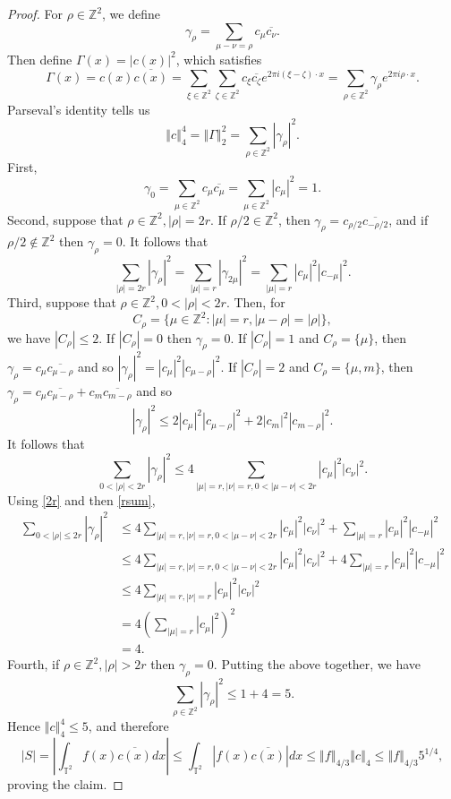 \documentclass{article}
\newcommand{\norm}[1]{\left\Vert #1 \right\Vert}
\theoremstyle{definition}
\begin{document}
\begin{proof}
For $\rho \in \mathbb{Z}^2$, we define
\[
\gamma_\rho = \sum_{\mu-\nu=\rho} c_\mu \overline{c_\nu}.
\]
Then  define 
$\Gamma(x) = |c(x)|^2$,
which satisfies
\[
\Gamma(x) = c(x) \overline{c(x)}=
\sum_{\xi \in \mathbb{Z}^2} \sum_{\zeta \in \mathbb{Z}^2} c_\xi \overline{c_\zeta} e^{2\pi i(\xi-\zeta)\cdot x}
=\sum_{\rho \in \mathbb{Z}^2} \gamma_\rho e^{2\pi i\rho \cdot x}.
\]
Parseval's identity tells us
\[
\norm{c}_4^4 = \norm{\Gamma}_2^2 = \sum_{\rho \in \mathbb{Z}^2} |\gamma_\rho|^2.
\]
First,
\[
\gamma_0 = \sum_{\mu \in \mathbb{Z}^2} c_\mu \overline{c_\mu}
=\sum_{\mu \in \mathbb{Z}^2} |c_\mu|^2
=1.
\]
Second, suppose that $\rho \in \mathbb{Z}^2, |\rho|=2r$. If $\rho/2 \in \mathbb{Z}^2$, then $\gamma_\rho = c_{\rho/2} \overline{c_{-\rho/2}}$, 
and if $\rho/2 \not \in \mathbb{Z}^2$ then $\gamma_\rho=0$. It follows that
\begin{equation}
\sum_{|\rho|=2r} |\gamma_\rho|^2 = \sum_{|\mu|=r} |\gamma_{2\mu}|^2 = 
\sum_{|\mu|=r} |c_\mu|^2 |c_{-\mu}|^2.
\label{2r}
\end{equation}
Third, suppose that $\rho \in \mathbb{Z}^2, 0<|\rho|<2r$. Then, for
\[
C_\rho=\{\mu \in \mathbb{Z}^2: |\mu|=r, |\mu-\rho|=|\rho|\},
\] 
we have $|C_\rho| \leq 2$. If $|C_\rho|=0$ then $\gamma_\rho=0$. If $|C_\rho|=1$ and $C_\rho=\{\mu\}$, then
$\gamma_\rho = c_\mu \overline{c_{\mu-\rho}}$ and so
$|\gamma_\rho|^2 = |c_\mu|^2 |c_{\mu-\rho}|^2$.
If $|C_\rho|=2$ and $C_\rho=\{\mu,m\}$, then
$\gamma_\rho=c_\mu \overline{c_{\mu-\rho}}+c_m \overline{c_{m-\rho}}$ and so
\[
|\gamma_\rho|^2 \leq 2 |c_\mu|^2 |c_{\mu-\rho}|^2+2|c_m|^2 |c_{m-\rho}|^2.
\]
It follows that
\[
\sum_{0<|\rho|<2r} |\gamma_\rho|^2 \leq 4\sum_{|\mu|=r, |\nu|=r, 0<|\mu-\nu|<2r} |c_\mu|^2 |c_\nu|^2.
\]
Using \eqref{2r} and then \eqref{rsum},
\begin{align*}
\sum_{0<|\rho| \leq 2r} |\gamma_\rho|^2&  \leq 4\sum_{|\mu|=r, |\nu|=r, 0<|\mu-\nu|<2r} |c_\mu|^2 |c_\nu|^2+
\sum_{|\mu|=r} |c_\mu|^2 |c_{-\mu}|^2\\
&\leq 4\sum_{|\mu|=r, |\nu|=r, 0<|\mu-\nu|<2r} |c_\mu|^2 |c_\nu|^2+4\sum_{|\mu|=r} |c_\mu|^2 |c_{-\mu}|^2\\
&\leq 4\sum_{|\mu|=r, |\nu|=r}|c_\mu|^2 |c_\nu|^2\\
&=4\left( \sum_{|\mu|=r} |c_\mu|^2 \right)^2\\
&=4.
\end{align*}
Fourth, if $\rho \in \mathbb{Z}^2, |\rho|>2r$ then $\gamma_\rho=0$. Putting the above together,
we have
\[
\sum_{\rho \in \mathbb{Z}^2} |\gamma_\rho|^2 \leq 1+4=5.
\]
Hence $\norm{c}_4^4\leq 5$, and therefore 
\[
|S|=\left| \int_{\mathbb{T}^2} f(x) \overline{c(x)} dx \right| 
\leq \int_{\mathbb{T}^2} |f(x) \overline{c(x)}| dx
\leq \norm{f}_{4/3} \norm{c}_4
\leq \norm{f}_{4/3} 5^{1/4},
\]
proving the claim.
\end{proof}
\end{document}
